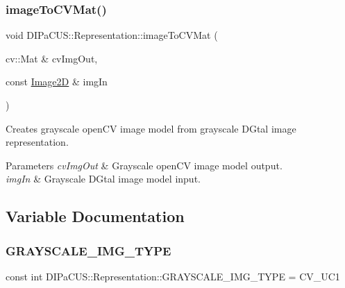 \subsubsection{\texorpdfstring{image\+To\+C\+V\+Mat()}{imageToCVMat()}}
{\footnotesize\ttfamily void D\+I\+Pa\+C\+U\+S\+::\+Representation\+::image\+To\+C\+V\+Mat (\begin{DoxyParamCaption}\item[{cv\+::\+Mat \&}]{cv\+Img\+Out,  }\item[{const \hyperlink{namespaceDIPaCUS_1_1Representation_ae97917e89f57298fda1626daad9f1733}{Image2D} \&}]{img\+In }\end{DoxyParamCaption})}



Creates grayscale open\+CV image model from grayscale D\+Gtal image representation. 


\begin{DoxyParams}{Parameters}
{\em cv\+Img\+Out} & Grayscale open\+CV image model output. \\
\hline
{\em img\+In} & Grayscale D\+Gtal image model input. \\
\hline
\end{DoxyParams}


\subsection{Variable Documentation}
\mbox{\label{namespaceDIPaCUS_1_1Representation_ad86d37ae840297d40c79295d1c7e6e52}} 
\subsubsection{\texorpdfstring{G\+R\+A\+Y\+S\+C\+A\+L\+E\+\_\+\+I\+M\+G\+\_\+\+T\+Y\+PE}{GRAYSCALE\_IMG\_TYPE}}
{\footnotesize\ttfamily const int D\+I\+Pa\+C\+U\+S\+::\+Representation\+::\+G\+R\+A\+Y\+S\+C\+A\+L\+E\+\_\+\+I\+M\+G\+\_\+\+T\+Y\+PE = C\+V\+\_\+U\+C1}

